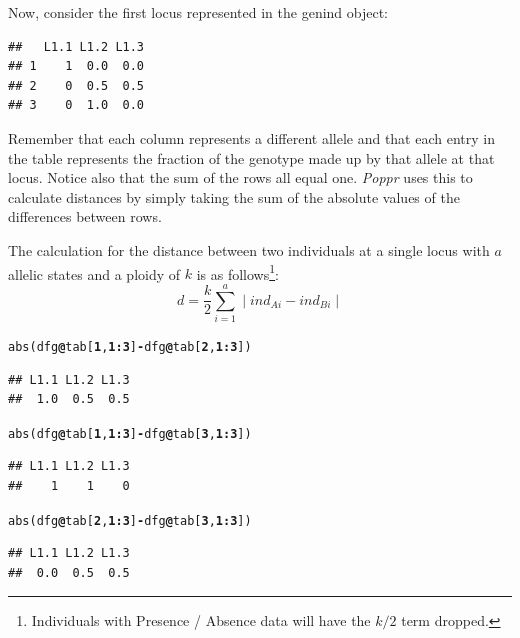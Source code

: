 \documentclass[letterpaper]{article}\usepackage[]{graphicx}\usepackage[]{color}
\makeatletter
\newcommand{\hlnum}[1]{\textcolor[rgb]{0.502,0,0.502}{\textbf{#1}}}%
\newcommand{\hlopt}[1]{\textcolor[rgb]{1,0,0.502}{\textbf{#1}}}%
\newcommand{\hlstd}[1]{\textcolor[rgb]{0,0,0}{#1}}%
\newcommand{\hlkwc}[1]{\textcolor[rgb]{0,0.502,0.753}{#1}}%
\newcommand{\hlkwd}[1]{\textcolor[rgb]{0,0.267,0.4}{#1}}%
\newenvironment{kframe}{%
 \def\at@end@of@kframe{}%
 \ifinner\ifhmode%
  \def\at@end@of@kframe{\end{minipage}}%
  \begin{minipage}{\columnwidth}%
 \fi\fi%
 \def\FrameCommand##1{\hskip\@totalleftmargin \hskip-\fboxsep
 \colorbox{shadecolor}{##1}\hskip-\fboxsep
     \hskip-\linewidth \hskip-\@totalleftmargin \hskip\columnwidth}%
 \MakeFramed {\advance\hsize-\width
   \@totalleftmargin\z@ \linewidth\hsize
   \@setminipage}}%
 {\par\unskip\endMakeFramed%
 \at@end@of@kframe}
\newenvironment{knitrout}{}{} %
\newcommand{\beq}{\begin{equation}}
\newcommand{\eeq}{\end{equation}}
\makeatother
\begin{document}
Now, consider the first locus represented in the genind object:
\begin{knitrout}\footnotesize
{}\color{fgcolor}\begin{kframe}
\begin{verbatim}
##   L1.1 L1.2 L1.3
## 1    1  0.0  0.0
## 2    0  0.5  0.5
## 3    0  1.0  0.0
\end{verbatim}
\end{kframe}
\end{knitrout}

Remember that each column represents a different allele and that each entry in the table represents the fraction of the genotype made up by that allele at that locus. Notice also that the sum of the rows all equal one. \textit{Poppr} uses this to calculate distances by simply taking the sum of the absolute values of the differences between rows.

The calculation for the distance between two individuals at a single locus with $a$ allelic states and a ploidy of $k$ is as follows\footnote{Individuals with Presence / Absence data will have the $k/2$ term dropped.}:
\beq
\label{eq:ia_d}
d = \displaystyle \frac{k}{2}\sum_{i=1}^{a} \mid ind_{Ai} - ind_{Bi}\mid
\eeq
\begin{knitrout}\footnotesize
{}\color{fgcolor}\begin{kframe}
\begin{alltt}
\hlkwd{abs}\hlstd{(dfg}\hlopt{@}\hlkwc{tab}\hlstd{[}\hlnum{1}\hlstd{,} \hlnum{1}\hlopt{:}\hlnum{3}\hlstd{]} \hlopt{-} \hlstd{dfg}\hlopt{@}\hlkwc{tab}\hlstd{[}\hlnum{2}\hlstd{,} \hlnum{1}\hlopt{:}\hlnum{3}\hlstd{])}
\end{alltt}
\begin{verbatim}
## L1.1 L1.2 L1.3 
##  1.0  0.5  0.5
\end{verbatim}
\begin{alltt}
\hlkwd{abs}\hlstd{(dfg}\hlopt{@}\hlkwc{tab}\hlstd{[}\hlnum{1}\hlstd{,} \hlnum{1}\hlopt{:}\hlnum{3}\hlstd{]} \hlopt{-} \hlstd{dfg}\hlopt{@}\hlkwc{tab}\hlstd{[}\hlnum{3}\hlstd{,} \hlnum{1}\hlopt{:}\hlnum{3}\hlstd{])}
\end{alltt}
\begin{verbatim}
## L1.1 L1.2 L1.3 
##    1    1    0
\end{verbatim}
\begin{alltt}
\hlkwd{abs}\hlstd{(dfg}\hlopt{@}\hlkwc{tab}\hlstd{[}\hlnum{2}\hlstd{,} \hlnum{1}\hlopt{:}\hlnum{3}\hlstd{]} \hlopt{-} \hlstd{dfg}\hlopt{@}\hlkwc{tab}\hlstd{[}\hlnum{3}\hlstd{,} \hlnum{1}\hlopt{:}\hlnum{3}\hlstd{])}
\end{alltt}
\begin{verbatim}
## L1.1 L1.2 L1.3 
##  0.0  0.5  0.5
\end{verbatim}
\end{kframe}
\end{knitrout}
\end{document}
